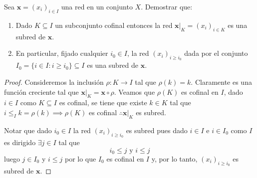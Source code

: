 \documentclass{article}
\theoremstyle{plain}
\theoremstyle{definition}
\newenvironment{ejercicio}[1]{\begin{trivlist}
\item[\hskip \labelsep {\bfseries Ejercicio}\hskip \labelsep {\bfseries #1.}]}{\end{trivlist}}
\begin{document}
\begin{ejercicio}{2}
    Sea \( \mathbf{x} = {(x_i)}_{i \in I} \) una red en un conjunto \( X \). Demostrar que:
    \begin{enumerate}
        \item Dado \( K \subseteq I \) un subconjunto cofinal entonces la red \( \mathbf{x}|_K = {(x_i)}_{i \in K} \) es una subred de \( \mathbf{x} \).
        \item En particular, fijado cualquier \( i_0 \in I \), la red \( {(x_i)}_{i \geq i_0} \) dada por el conjunto \( I_0 = \{ i \in I : i \geq i_0 \} \subseteq I \) es una subred de \( \mathbf{x} \).
    \end{enumerate}
\end{ejercicio}
\begin{proof}
    Consideremos la inclusión \( \rho : K \to I \) tal que \( \rho(k) = k \). Claramente es una función creciente tal que \( \mathbf{x}|_K = \mathbf{x} \circ \rho \). Veamos que \( \rho(K) \) es cofinal en \( I \),
    dado \( i \in I \) como \( K \subseteq I \) es cofinal, se tiene que existe \( k \in K \) tal que \( i \leq_I k = \rho(k) \implies \rho(K) \) es cofinal \( \therefore \mathbf{x}|_K \) es subred.

    Notar que dado \( i_0 \in I \) la red \( {(x_i)}_{i \geq i_0} \) es subred pues dado \( i \in I \) e \( i \in I_0 \) como \( I \) es dirigido \( \exists j \in I \) tal que \[
        i_0 \leq j \text{ y } i \leq j
    \]
    luego \( j \in I_0 \) y \( i \leq j \) por lo que \( I_0 \) es cofinal en \( I \) y, por lo tanto, \( {(x_i)}_{i \geq i_0} \) es subred de \( \mathbf{x} \).
\end{proof}
\end{document}
